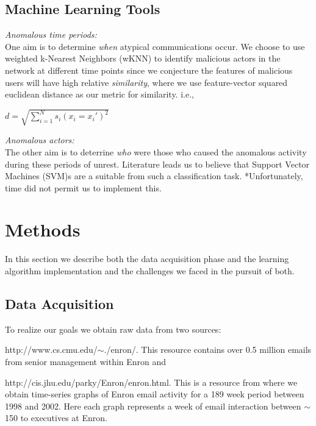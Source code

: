\documentclass[11pt,letterpaper]{article}
\begin{document}
\subsection{Machine Learning Tools}
\hspace*{10pt}\textit{Anomalous time periods:} \\
One aim is to determine \textit{when} atypical communications occur. We choose to
use weighted k-Nearest Neighbors (wKNN) to identify malicious actors in the network
at different time points since we conjecture the features of malicious users will
have high relative \textit{similarity}, where we use feature-vector squared euclidean distance
as our metric for similarity. i.e.,

$d = \sqrt{\sum\limits_{i=1}^N s_i (x_i = x_i')^2 }$


\textit{Anomalous actors:} \\
The other aim is to deterrine \textit{who} were those who caused the anomalous
activity during these periods of unrest. Literature \cite{shon2007hybrid,shon2005machine}
leads us to believe that Support Vector Machines (SVM)s are a suitable from such 
a classification task. *Unfortunately, time did not permit us to implement this.


\section{Methods}
In this section we describe both the data acquisition phase and the learning algorithm
implementation and the challenges we faced in the pursuit of both.

\subsection{Data Acquisition}
To realize our goals we obtain raw data from two sources:
\begin{inparaenum}[\itshape(i)]
\item http://www.cs.cmu.edu/$\sim$./enron/. This resource contains over 0.5 million
emails from senior management within Enron and 
\item http://cis.jhu.edu/parky/Enron/enron.html. This is a resource from where we obtain
time-series graphs of Enron email activity for a 189 week period between 1998 and 2002.
Here each graph represents a week of email interaction between $\sim$150 to executives
at Enron.
\end{inparaenum}
\end{document}
